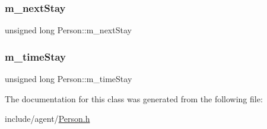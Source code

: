 \mbox{\label{class_person_ad8809184fc32b28b1bcc115b10493b55}} 
\subsubsection{\texorpdfstring{m\+\_\+next\+Stay}{m\_nextStay}}
{\footnotesize\ttfamily unsigned long Person\+::m\+\_\+next\+Stay\hspace{0.3cm}{\ttfamily [private]}}

\mbox{\label{class_person_a5554109f1f3a7c466f02346d0061c6e7}} 
\subsubsection{\texorpdfstring{m\+\_\+time\+Stay}{m\_timeStay}}
{\footnotesize\ttfamily unsigned long Person\+::m\+\_\+time\+Stay\hspace{0.3cm}{\ttfamily [private]}}



The documentation for this class was generated from the following file\+:\begin{DoxyCompactItemize}
\item 
include/agent/\hyperlink{_person_8h}{Person.\+h}\end{DoxyCompactItemize}
